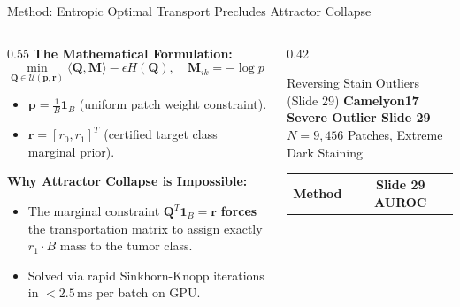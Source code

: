 \documentclass[aspectratio=169,10pt]{beamer}
\begin{document}
\begin{frame}{Method: Entropic Optimal Transport Precludes Attractor Collapse}
    \begin{columns}[T]
        \begin{column}{0.55\textwidth}
            \textbf{The Mathematical Formulation:}
            \begin{equation*}
                \min_{\mathbf{Q} \in \mathcal{U}(\mathbf{p}, \mathbf{r})} \langle \mathbf{Q}, \mathbf{M} \rangle - \epsilon H(\mathbf{Q}), \quad \mathbf{M}_{ik} = -\log p(y=k \mid x_i)
            \end{equation*}
            \begin{itemize}
                \item $\mathbf{p} = \frac{1}{B} \mathbf{1}_B$ (uniform patch weight constraint).
                \item $\mathbf{r} = [r_0, r_1]^T$ (certified target class marginal prior).
            \end{itemize}
            \vspace{0.2cm}
            \textbf{Why Attractor Collapse is Impossible:}
            \begin{itemize}
                \item The marginal constraint $\mathbf{Q}^T \mathbf{1}_B = \mathbf{r}$ \textbf{forces} the transportation matrix to assign exactly $r_1 \cdot B$ mass to the tumor class.
                \item Solved via rapid Sinkhorn-Knopp iterations in $< 2.5$\,ms per batch on GPU.
            \end{itemize}
        \end{column}
        \begin{column}{0.42\textwidth}
            \begin{block}{Reversing Stain Outliers (Slide 29)}
                \centering
                \small
                \textbf{Camelyon17 Severe Outlier Slide 29}\\
                $N = 9,456$ Patches, Extreme Dark Staining\\
                \vspace{0.2cm}
                \begin{tabular}{lc}
                    \toprule
                    \textbf{Method} & \textbf{Slide 29 AUROC} \\

\end{tabular}
\end{block}
\end{column}
\end{columns}
\end{frame}
\end{document}

